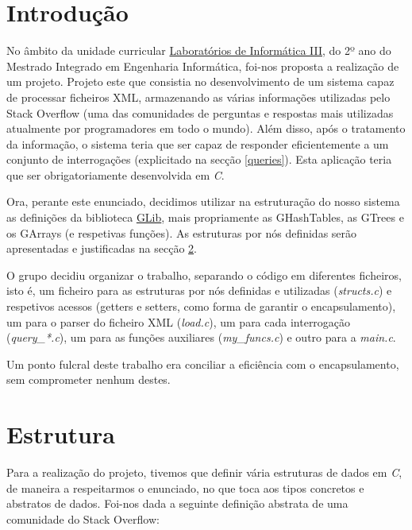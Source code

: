 \documentclass[a4paper, 11pt, oneside]{article}
\begin{document}

\tableofcontents
\lstlistoflistings

\newpage


\section{Introdução}

No âmbito da unidade curricular \underline{Laboratórios de Informática III}, do 2º ano do Mestrado Integrado em Engenharia Informática, foi-nos proposta a realização de um projeto. Projeto este que consistia no desenvolvimento de um sistema capaz de processar ficheiros XML, armazenando as várias informações utilizadas pelo Stack Overflow (uma das comunidades de perguntas e respostas mais utilizadas atualmente por programadores em todo o mundo). Além disso, após o tratamento da informação, o sistema teria que ser capaz de responder eficientemente a um conjunto de interrogações (explicitado na secção \ref{queries}). Esta aplicação teria que ser obrigatoriamente desenvolvida em \textit{C}.

Ora, perante este enunciado, decidimos utilizar na estruturação do nosso sistema as definições da biblioteca \href{https://developer.gnome.org/glib}{GLib}, mais propriamente as GHashTables, as GTrees e os GArrays (e respetivas funções). As estruturas por nós definidas serão apresentadas e justificadas na secção \ref{structs}.

O grupo decidiu organizar o trabalho, separando o código em diferentes ficheiros, isto é, um ficheiro para as estruturas por nós definidas e utilizadas (\textit{structs.c}) e respetivos acessos (getters e setters, como forma de garantir o encapsulamento), um para o parser do ficheiro XML (\textit{load.c}), um para cada interrogação (\textit{query\_*.c}), um para as funções auxiliares (\textit{my\_funcs.c}) e outro para a \textit{main.c}.

Um ponto fulcral deste trabalho era conciliar a eficiência com o encapsulamento, sem comprometer nenhum destes.


\newpage
\section{Estrutura}
\label{structs}

Para a realização do projeto, tivemos que definir vária estruturas de dados em \textit{C}, de maneira a respeitarmos o enunciado, no que toca aos tipos concretos e abstratos de dados. Foi-nos dada a seguinte definição abstrata de uma comunidade do Stack Overflow:
\end{document}
